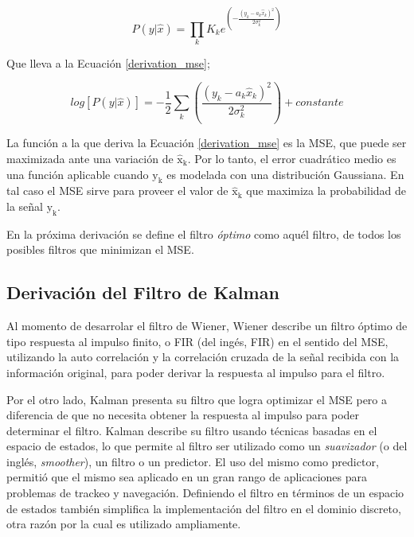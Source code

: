 \documentclass[10pt,a4paper]{article}
\begin{document}
\begin{itemize}
\begin{equation}
    P(y|\hat{x}) = \prod_k K_ke^{\left(- \frac{(y_k - a_k\hat{x}_k)^2}{2\sigma^2_k}\right)} \label{max_likelihood}
\end{equation}

Que lleva a la Ecuaci\'on \ref{derivation_mse};

\begin{equation}
    log[P\left(y|\hat{x}\right)] = - \frac{1}{2}\sum_k \left(\frac{(y_k -
    a_k\hat{x}_k)^2}{2\sigma^2_k}\right) + constante \label{derivation_mse}
\end{equation}

La funci\'on a la que deriva la Ecuaci\'on \ref{derivation_mse} es la
\acrshort{MSE}, que puede ser maximizada ante una variaci\'on de
$\mathrm{\hat{x}_k}$. Por lo tanto, el error cuadr\'atico medio es una funci\'on
aplicable cuando $\mathrm{y_k}$ es modelada con una distribuci\'on Gaussiana.
En tal caso el \acrshort{MSE} sirve para proveer el valor de
$\mathrm{\hat{x}_k}$ que maximiza la probabilidad de la señal $\mathrm{y_k}$.

En la pr\'oxima derivaci\'on se define el filtro \emph{\'optimo} como aqu\'el
filtro, de todos los posibles filtros que minimizan el \acrshort{MSE}.

\subsection{Derivaci\'on del Filtro de Kalman}

\noindent Al momento de desarrolar el filtro de Wiener, Wiener describe un 
filtro \'optimo de tipo respuesta al impulso finito, o \acrshort{FIR} (del 
ing\'es, \acrlong{FIR}) en el sentido del \acrshort{MSE}, utilizando la auto
correlaci\'on y la correlaci\'on cruzada de la señal recibida con la
informaci\'on original, para poder derivar la respuesta al impulso para el
filtro. 

\noindent Por el otro lado, Kalman presenta su filtro que logra optimizar el
\acrshort{MSE} pero a diferencia de que no necesita obtener la respuesta al
impulso para poder determinar el filtro. Kalman describe su filtro usando
t\'ecnicas basadas en el espacio de estados, lo que permite al filtro ser
utilizado como un \emph{suavizador} (o del ingl\'es, \emph{smoother}), un filtro
o un predictor. El uso del mismo como predictor, permiti\'o que el mismo sea
aplicado en un gran rango de aplicaciones para problemas de trackeo y
navegaci\'on. Definiendo el filtro en t\'erminos de un espacio de estados
tambi\'en simplifica la implementaci\'on del filtro en el dominio discreto, otra
raz\'on por la cual es utilizado ampliamente.


\end{itemize}
\end{document}
